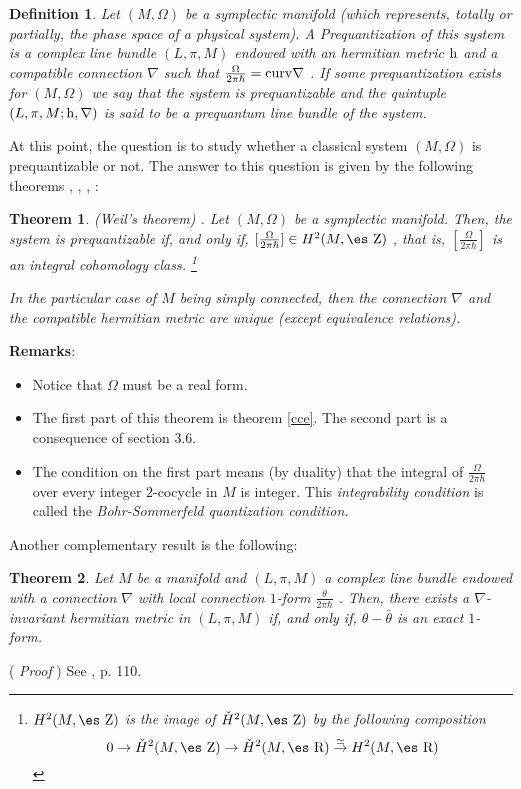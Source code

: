 \documentclass[12pt]{article}
\theoremstyle{plain}
\newtheorem{teor}{Theorem}
\newtheorem{definition}{Definition}
\def\dst{\(}
\def\proof{( {\it Proof} )\quad}
\def\map#1{\mathrel{\mathop{\to}\limits^{#1}}}
\def\qed{\ifvmode\removelastskip\fi
{\unskip\nobreak\hfil\penalty50\hbox{}\nobreak\hfil
\hbox{\vrule height1.2ex width1.2ex}\parfillskip=0pt
\finalhyphendemerits=0 \par\smallskip}}
\def\h{{\rm h}}
\def\Zahl{\mbox{\es Z}}
\def\Real{\mbox{\es R}}
\begin{document}
\begin{definition}
Let $(M,\Omega )$ be a symplectic manifold
(which represents, totally or partially,
the phase space of a physical system).
A {\rm Prequantization} of this system is a complex line bundle
$(L,\pi ,M)$ endowed with an hermitian metric $\h$
and a compatible connection $\nabla$ such that
\dst\frac{\Omega}{2\pi\hbar} = {\rm curv} \nabla\) .
If some prequantization exists for $(M,\Omega )$
we say that the system is {\rm prequantizable}
and the quintuple $(L,\pi ,M;\h ,\nabla )$
is said to be a {\rm prequantum line bundle} of the system.
\label{prequan}
\end{definition}

At this point, the question is
to study whether a classical system $(M,\Omega )$ is prequantizable or
not.
The answer to this question is given
by the following theorems
\cite{AM-78}, \cite{Ko-70}, \cite{SW-76}, \cite{Sn-80}:

\begin{teor}
{\rm (Weil's theorem) \cite{We-58}}.
Let $(M,\Omega )$ be a symplectic manifold.
Then, the system is prequantizable
if, and only if, \dst[\frac{\Omega}{2\pi\hbar}] \in H^2(M,\Zahl )\) ,
that is, \dst[\frac{\Omega}{2\pi\hbar}]\)
is an {\it integral cohomology class}.%
\footnote{
$H^2(M,\Zahl )$ is the image of $\check H^2(M,\Zahl )$
by the following composition
$$
0 \to \check H^2(M,\Zahl ) \to \check H^2(M,\Real ) \map{\simeq}
H^2(M,\Real)
$$
}

In the particular case of $M$ being simply connected,
then the connection $\nabla$ and the compatible hermitian metric
are unique (except equivalence relations).
\label{weil}
\end{teor}

{\bf Remarks}:
\begin{itemize}
\item
Notice that $\Omega$ must be a real form.
\item
The first part of this theorem is theorem \ref{cce}.
The second part is a consequence of section 3.6.
\item
The condition on the first part means (by duality) that the
integral of \dst\frac{\Omega}{2\pi\hbar}\) over every integer
$2$-cocycle in $M$ is integer. This {\it integrability condition}
is called the {\it Bohr-Sommerfeld quantization condition}.
\end{itemize}

Another complementary result is the following:

\begin{teor}
Let $M$ be a manifold and
$(L,\pi ,M)$ a complex line bundle
endowed with a connection $\nabla$
with local connection $1$-form \dst\frac{\theta}{2\pi\hbar}\) .
Then, there exists a $\nabla$-invariant
hermitian metric in $(L,\pi ,M)$
if, and only if, $\theta -\bar \theta$ is an exact $1$-form.
\label{ihm}
\end{teor}
\proof
See \cite{Ko-70}, p. 110.
\qed
\end{document}
